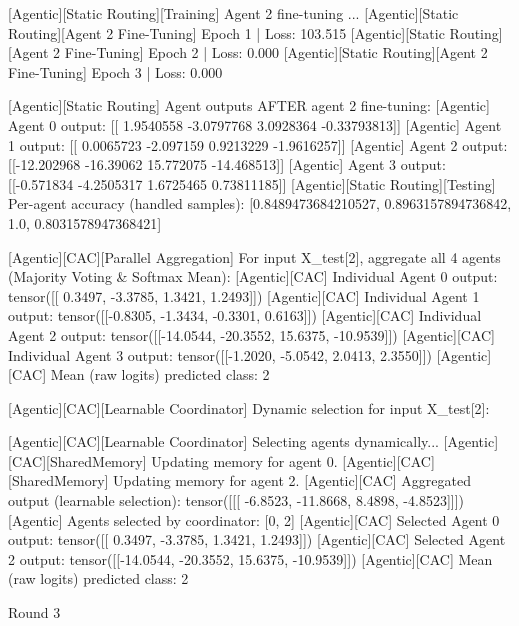 [Agentic][Static Routing][Training] Agent 2 fine-tuning ...
[Agentic][Static Routing][Agent 2 Fine-Tuning] Epoch 1 | Loss: 103.515
[Agentic][Static Routing][Agent 2 Fine-Tuning] Epoch 2 | Loss: 0.000
[Agentic][Static Routing][Agent 2 Fine-Tuning] Epoch 3 | Loss: 0.000

[Agentic][Static Routing] Agent outputs AFTER agent 2 fine-tuning:
[Agentic] Agent 0 output: [[ 1.9540558  -3.0797768   3.0928364  -0.33793813]]
[Agentic] Agent 1 output: [[ 0.0065723 -2.097159   0.9213229 -1.9616257]]
[Agentic] Agent 2 output: [[-12.202968 -16.39062   15.772075 -14.468513]]
[Agentic] Agent 3 output: [[-0.571834   -4.2505317   1.6725465   0.73811185]]
[Agentic][Static Routing][Testing] Per-agent accuracy (handled samples): [0.8489473684210527, 0.8963157894736842, 1.0, 0.8031578947368421]

[Agentic][CAC][Parallel Aggregation] For input X_test[2], aggregate all 4 agents (Majority Voting & Softmax Mean):
[Agentic][CAC] Individual Agent 0 output: tensor([[ 0.3497, -3.3785,  1.3421,  1.2493]])
[Agentic][CAC] Individual Agent 1 output: tensor([[-0.8305, -1.3434, -0.3301,  0.6163]])
[Agentic][CAC] Individual Agent 2 output: tensor([[-14.0544, -20.3552,  15.6375, -10.9539]])
[Agentic][CAC] Individual Agent 3 output: tensor([[-1.2020, -5.0542,  2.0413,  2.3550]])
[Agentic][CAC] Mean (raw logits) predicted class: 2

[Agentic][CAC][Learnable Coordinator] Dynamic selection for input X_test[2]:

[Agentic][CAC][Learnable Coordinator] Selecting agents dynamically...
[Agentic][CAC][SharedMemory] Updating memory for agent 0.
[Agentic][CAC][SharedMemory] Updating memory for agent 2.
[Agentic][CAC] Aggregated output (learnable selection): tensor([[[ -6.8523, -11.8668,   8.4898,  -4.8523]]])
[Agentic] Agents selected by coordinator: [0, 2]
[Agentic][CAC] Selected Agent 0 output: tensor([[ 0.3497, -3.3785,  1.3421,  1.2493]])
[Agentic][CAC] Selected Agent 2 output: tensor([[-14.0544, -20.3552,  15.6375, -10.9539]])
[Agentic][CAC] Mean (raw logits) predicted class: 2

Round 3

